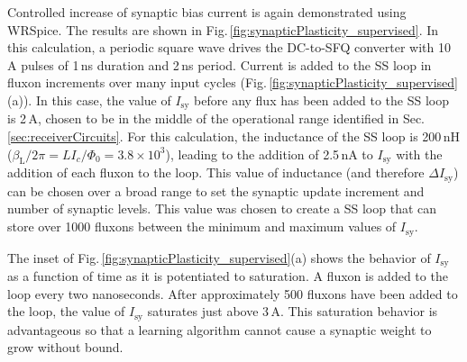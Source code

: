 \documentclass[aip,amsmath,amssymb,reprint,nofootinbib]{revtex4-1}
\begin{document}
Controlled increase of synaptic bias current is again demonstrated using WRSpice. The results are shown in Fig.\,\ref{fig:synapticPlasticity_supervised}. In this calculation, a periodic square wave drives the DC-to-SFQ converter with 10\,\textmu A pulses of 1\,ns duration and 2\,ns period. Current is added to the SS loop in fluxon increments over many input cycles (Fig.\,\ref{fig:synapticPlasticity_supervised}(a)). In this case, the value of $I_{\mathrm{sy}}$ before any flux has been added to the SS loop is 2\,\textmu A, chosen to be in the middle of the operational range identified in Sec.\,\ref{sec:receiverCircuits}. For this calculation, the inductance of the SS loop is 200\,nH ($\beta_{\mathrm{L}}/2\pi = L I_c/\Phi_0 = 3.8\times 10^3$), leading to the addition of 2.5\,nA to $I_{\mathrm{sy}}$ with the addition of each fluxon to the loop. This value of inductance (and therefore $\Delta I_{\mathrm{sy}}$) can be chosen over a broad range to set the synaptic update increment and number of synaptic levels. This value was chosen to create a SS loop that can store over 1000 fluxons between the minimum and maximum values of $I_{\mathrm{sy}}$.

The inset of Fig.\,\ref{fig:synapticPlasticity_supervised}(a) shows the behavior of $I_{\mathrm{sy}}$ as a function of time as it is potentiated to saturation. A fluxon is added to the loop every two nanoseconds. After approximately 500 fluxons have been added to the loop, the value of $I_{\mathrm{sy}}$ saturates just above 3\,\textmu A. This saturation behavior is advantageous so that a learning algorithm cannot cause a synaptic weight to grow without bound. 
\end{document}
